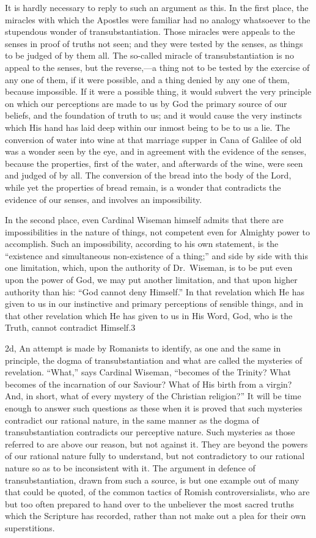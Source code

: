 \documentclass[]{book}
\begin{document}
It is hardly necessary to reply to such an argument as this. In the first place, the miracles with which the Apostles were familiar had no analogy whatsoever to the stupendous wonder of transubstantiation. Those miracles were appeals to the senses in proof of truths not seen; and they were tested by the senses, as things to be judged of by them all. The so-called miracle of transubstantiation is no appeal to the senses, but the reverse,---a thing not to be tested by the exercise of any one of them, if it were possible, and a thing denied by any one of them, because impossible. If it were a possible thing, it would subvert the very principle on which our perceptions are made to us by God the primary source of our beliefs, and the foundation of truth to us; and it would cause the very instincts which His hand has laid deep within our inmost being to be to us a lie. The conversion of water into wine at that marriage supper in Cana of Galilee of old was a wonder seen by the eye, and in agreement with the evidence of the senses, because the properties, first of the water, and afterwards of the wine, were seen and judged of by all. The conversion of the bread into the body of the Lord, while yet the properties of bread remain, is a wonder that contradicts the evidence of our senses, and involves an impossibility.

In the second place, even Cardinal Wiseman himself admits that there are impossibilities in the nature of things, not competent even for Almighty power to accomplish. Such an impossibility, according to his own statement, is the ``existence and simultaneous non-existence of a thing;'' and side by side with this one limitation, which, upon the authority of Dr.~Wiseman, is to be put even upon the power of God, we may put another limitation, and that upon higher authority than his: ``God cannot deny Himself.'' In that revelation which He has given to us in our instinctive and primary perceptions of sensible things, and in that other revelation which He has given to us in His Word, God, who is the Truth, cannot contradict Himself.3

2d, An attempt is made by Romanists to identify, as one and the same in principle, the dogma of transubstantiation and what are called the mysteries of revelation. ``What,'' says Cardinal Wiseman, ``becomes of the Trinity? What becomes of the incarnation of our Saviour? What of His birth from a virgin? And, in short, what of every mystery of the Christian religion?'' It will be time enough to answer such questions as these when it is proved that such mysteries contradict our rational nature, in the same manner as the dogma of transubstantiation contradicts our perceptive nature. Such mysteries as those referred to are above our reason, but not against it. They are beyond the powers of our rational nature fully to understand, but not contradictory to our rational nature so as to be inconsistent with it. The argument in defence of transubstantiation, drawn from such a source, is but one example out of many that could be quoted, of the common tactics of Romish controversialists, who are but too often prepared to hand over to the unbeliever the most sacred truths which the Scripture has recorded, rather than not make out a plea for their own superstitions.
\end{document}
